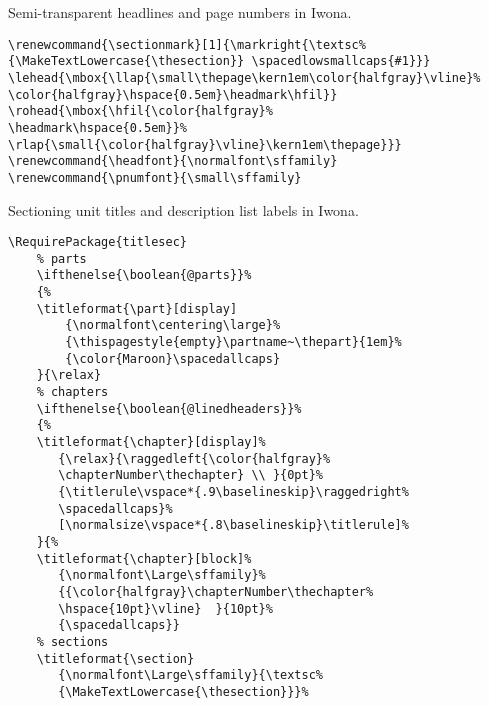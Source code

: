 Semi-transparent headlines and page numbers in Iwona.
\begin{lstlisting}
\renewcommand{\sectionmark}[1]{\markright{\textsc%
{\MakeTextLowercase{\thesection}} \spacedlowsmallcaps{#1}}}
\lehead{\mbox{\llap{\small\thepage\kern1em\color{halfgray}\vline}%
\color{halfgray}\hspace{0.5em}\headmark\hfil}} 
\rohead{\mbox{\hfil{\color{halfgray}%
\headmark\hspace{0.5em}}%
\rlap{\small{\color{halfgray}\vline}\kern1em\thepage}}}
\renewcommand{\headfont}{\normalfont\sffamily}
\renewcommand{\pnumfont}{\small\sffamily}
\end{lstlisting}


  
Sectioning unit titles and description list labels in Iwona.
\begin{lstlisting}
\RequirePackage{titlesec}
    % parts
    \ifthenelse{\boolean{@parts}}%
    {%
    \titleformat{\part}[display]
        {\normalfont\centering\large}%
        {\thispagestyle{empty}\partname~\thepart}{1em}%
        {\color{Maroon}\spacedallcaps}
    }{\relax}
    % chapters
    \ifthenelse{\boolean{@linedheaders}}%
    {%
    \titleformat{\chapter}[display]%             
       {\relax}{\raggedleft{\color{halfgray}%
       \chapterNumber\thechapter} \\ }{0pt}%
       {\titlerule\vspace*{.9\baselineskip}\raggedright%
       \spacedallcaps}%
       [\normalsize\vspace*{.8\baselineskip}\titlerule]%
    }{%  
    \titleformat{\chapter}[block]%
       {\normalfont\Large\sffamily}%
       {{\color{halfgray}\chapterNumber\thechapter%
       \hspace{10pt}\vline}  }{10pt}%
       {\spacedallcaps}}
    % sections
    \titleformat{\section} 
       {\normalfont\Large\sffamily}{\textsc%
       {\MakeTextLowercase{\thesection}}}%

\end{lstlisting}
